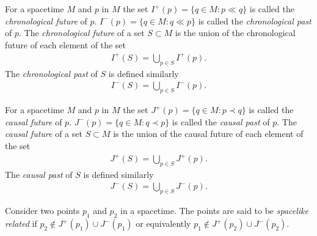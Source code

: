 \begin{definition}
    \label{def:chronological-future-and-chronological-past}
    \leanok
    For a spacetime $M$ and $p$ in $M$ the set $I^+(p) = \{q \in M : p \ll q\}$ is called the \textit{chronological future} of $p$. $I^-(p) = \{q \in M : q \ll p\}$ is called the \textit{chronological past} of $p$. The \textit{chronological future} of a set $S \subset M$ is the union of the chronological future of each element of the set
    \begin{align}
        I^+(S) = \bigcup\limits_{p \in S} I^+(p).
    \end{align}
    The \textit{chronological past} of $S$ is defined similarly
    \begin{align}
        I^-(S) = \bigcup\limits_{p \in S} I^-(p).
    \end{align}
\end{definition}

\begin{definition}
    \label{def:causal-future-and-causal-past}
    \leanok
    For a spacetime $M$ and $p$ in $M$ the set $J^+(p) = \{q \in M : p \prec q\}$ is called the \textit{causal future} of $p$. $J^-(p) = \{q \in M : q \prec p\}$ is called the \textit{causal past} of $p$. The \textit{causal future} of a set $S \subset M$ is the union of the causal future of each element of the set
    \begin{align}
        J^+(S) = \bigcup\limits_{p \in S} J^+(p).
    \end{align}
    The \textit{causal past} of $S$ is defined similarly
    \begin{align}
        J^-(S) = \bigcup\limits_{p \in S} J^-(p).
    \end{align}
\end{definition}

\begin{definition}
    \label{def:spacelike-related}
    \leanok
    Consider two points $p_1$ and $p_2$ in a spacetime. The points are said to be \textit{spacelike related} if $p_2 \notin J^+(p_1) \cup J^-(p_1)$ or equivalently $p_1 \notin J^+(p_2) \cup J^-(p_2)$.
\end{definition}

